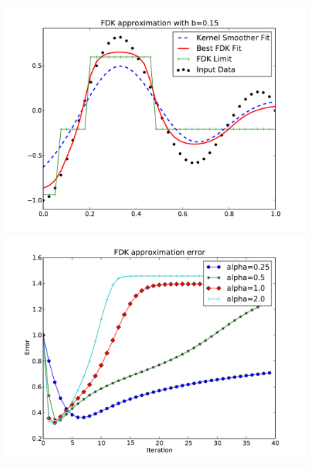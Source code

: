 \begin{figure}[!htb]
    \includegraphics[width=\linewidth]{./figs/sqrtxcosx.pdf}
  \endminipage\hfill
    \includegraphics[width=\linewidth]{./figs/sqrtxcosxerr.pdf}
  \endminipage
\end{figure}

